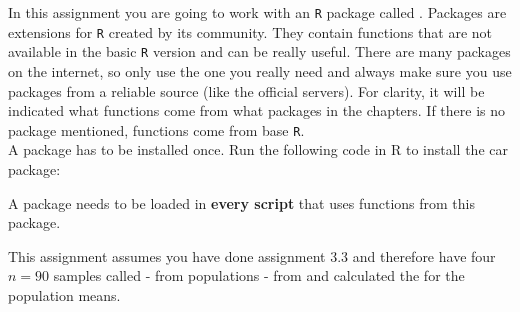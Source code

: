 

In this assignment you are going to work with an \texttt{R} package called . Packages are extensions for \texttt{R} created by its community. They contain functions that are not available in the basic \texttt{R} version and can be really useful. There are many packages on the internet, so only use the one you really need and always make sure you use packages from a reliable source (like the official  servers). For clarity, it will be indicated what functions come from what packages in the chapters. If there is no package mentioned, functions come from base \texttt{R}. \\

A package has to be installed once. Run the following code in R to install the car package: \\


A package needs to be loaded in \textbf{every script} that uses functions from this package. \\


This assignment assumes you have done assignment 3.3 and therefore have four $n = 90$ samples called  -  from populations  -  from  and calculated the  for the population means. \\





\clearpage %


